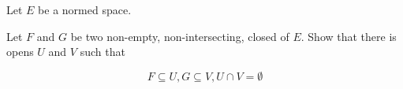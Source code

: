 Let $E$ be a normed space.

Let $F$ and $G$ be two non-empty, non-intersecting, closed of $E$. Show that there is opens $U$ and $V$ such that

\[F \subseteq U, G \subseteq V, U \cap V = \emptyset\]
